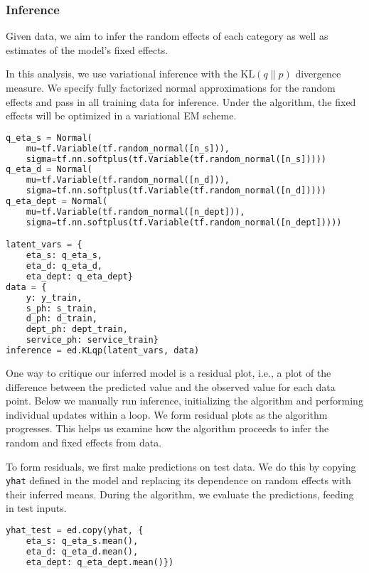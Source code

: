 \subsubsection{Inference}

Given data, we aim to infer the random effects of each category as
well as estimates of the model's fixed effects.

In this analysis, we use variational inference with the
$\text{KL}(q\|p)$ divergence measure. We specify fully factorized
normal approximations for the random effects and pass in all training
data for inference. Under the algorithm, the fixed effects will be
optimized in a variational EM scheme.

\begin{lstlisting}[language=Python]
q_eta_s = Normal(
    mu=tf.Variable(tf.random_normal([n_s])),
    sigma=tf.nn.softplus(tf.Variable(tf.random_normal([n_s]))))
q_eta_d = Normal(
    mu=tf.Variable(tf.random_normal([n_d])),
    sigma=tf.nn.softplus(tf.Variable(tf.random_normal([n_d]))))
q_eta_dept = Normal(
    mu=tf.Variable(tf.random_normal([n_dept])),
    sigma=tf.nn.softplus(tf.Variable(tf.random_normal([n_dept]))))

latent_vars = {
    eta_s: q_eta_s,
    eta_d: q_eta_d,
    eta_dept: q_eta_dept}
data = {
    y: y_train,
    s_ph: s_train,
    d_ph: d_train,
    dept_ph: dept_train,
    service_ph: service_train}
inference = ed.KLqp(latent_vars, data)
\end{lstlisting}

One way to critique our inferred model is a residual plot, i.e., a
plot of the difference between the predicted value and the observed
value for each data point. Below we manually run inference,
initializing the algorithm and performing individual updates within a
loop. We form residual plots as the algorithm progresses. This helps
us examine how the algorithm proceeds to infer the random and fixed
effects from data.

To form residuals, we first make predictions on test data. We do this
by copying \texttt{yhat} defined in the model and replacing its
dependence on random effects with their inferred means. During the
algorithm, we evaluate the predictions, feeding in test inputs.

\begin{lstlisting}[language=Python]
yhat_test = ed.copy(yhat, {
    eta_s: q_eta_s.mean(),
    eta_d: q_eta_d.mean(),
    eta_dept: q_eta_dept.mean()})
\end{lstlisting}

